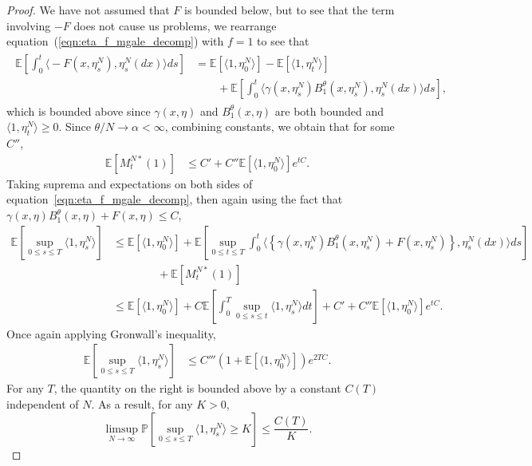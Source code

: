 \documentclass[EJP]{ejpecp} %
\newcommand{\IP}{\mathbb P}
\newcommand{\IE}{\mathbb E}
\begin{document}
\begin{proof}
	We have not assumed that $F$ is bounded below, but to see that the 
	term involving $-F$ does not cause us problems, we rearrange
	equation~(\ref{eqn:eta_f_mgale_decomp}) 
	with $f=1$ to see that
	\begin{align}
		\label{integral of -F}
        \begin{split}
\IE\left[\int_0^t \Big\langle -F(x, \eta^N_s), \eta^N_s(dx) \Big\rangle ds \right]
        &= \IE[\langle 1, \eta^N_0\rangle] -\IE[\langle 1,\eta^N_t\rangle]
            \\&\qquad {}
	+ \IE\left[\int_0^t\Big\langle \gamma(x,\eta_s^N) B^\theta_1(x, \eta_s^N),\eta_s^N(dx)\Big\rangle ds\right],
        \end{split}
	\end{align}
which is bounded above since $\gamma (x,\eta)$ and $B^\theta_1(x,\eta)$ are both bounded and 
$\langle 1,\eta_t^N \rangle\geq 0$. 
    Since $\theta/N \to \alpha < \infty$,
    combining constants, we obtain that for some $C''$,
    \begin{align*}
        \IE\left[ M^{N*}_t(1) \right]
        &\le
        C' + C'' \IE[ \langle 1, \eta_0^N \rangle ] e^{tC} .
    \end{align*}
    Taking suprema and expectations on both sides of equation~\eqref{eqn:eta_f_mgale_decomp},
    then again using the fact that $\gamma(x, \eta) B^\theta_1(x, \eta) + F(x, \eta) \le C$,
    \begin{align*}
        \IE\left[\sup_{0 \le s \le T} \langle 1, \eta^N_s \rangle \right]
        &\le
        \IE[\langle 1, \eta^N_0 \rangle]
        + \IE\left[
            \sup_{0 \le t \le T}
            \int_0^t 
	    \Big\langle\left\{
                \gamma(x, \eta^N_s)
                B^\theta_1(x, \eta^N_s)
                + F(x, \eta^N_s)
            \right\}, \eta^N_s(dx) \Big\rangle ds
        \right]
        \\ & \qquad\qquad {}
        + \IE[M^{N*}_t(1)] 
        \\
        &\le
        \IE[\langle 1, \eta^N_0 \rangle]
        + C \IE\left[
            \int_0^T \sup_{0 \le s \le t} \langle 1, \eta^N_s \rangle dt
        \right]
        + C' + C'' \IE[ \langle 1, \eta_0^N \rangle ] e^{tC} .
    \end{align*}
    Once again applying Gronwall's inequality,
    \begin{align*}
        \IE\left[\sup_{0 \le s \le T} \langle 1, \eta^N_s \rangle \right]
        &\le
        C''' 
        \left(1+ \IE[\langle 1, \eta^N_0 \rangle]\right) e^{2TC} .
    \end{align*}
    For any $T$,
    the quantity on the right is bounded above by a constant $C(T)$ independent of $N$.
    As a result, for any $K > 0$,
    \begin{equation*}
    \limsup_{N \to \infty}
        \IP\left[ \sup_{0 \le s \le T} \langle 1, \eta^{N}_{s} \rangle \geq K \right]
        \leq
        \frac{C(T)}{K}.
    \end{equation*}
\end{proof}
\end{document}
